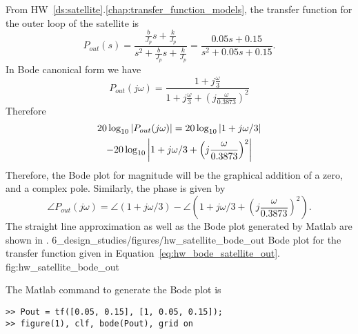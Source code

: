 From HW~\ref{ds:satellite}.\ref{chap:transfer_function_models}, the transfer function for the outer loop of the satellite is 
\begin{equation}\label{eq:hw_bode_satellite_out_tf}
P_{out}(s) = \frac{\frac{b}{J_p}s+\frac{k}{J_p}}{s^2+\frac{b}{J_p}s+\frac{k}{J_p}} =
\frac{0.05s + 0.15}{s^2+0.05s+0.15}. 
\end{equation}
In Bode canonical form we have
\[
P_{out}(j\omega) = \frac{1+j\frac{\omega}{3}}{1+j\frac{\omega}{3} + \left(j\frac{\omega}{0.3873}\right)^2}
\]
Therefore
\begin{multline} \label{eq:hw_bode_satellite_out}
20\log_{10}\left|P_{out}(j\omega)\right|=
	20\log_{10} \left|1+j\omega/3\right| \\
	-20\log_{10}\left|1+j\omega/3 + \left(j\frac{\omega}{0.3873}\right)^2\right|
\end{multline}
Therefore, the Bode plot for magnitude will be the graphical addition of a zero, and a complex pole.
Similarly, the phase is given by
\[
\angle P_{out}(j\omega) = 
	\angle \left(1+j\omega/3\right)
	- \angle \left(1+j\omega/3 + \left(j\frac{\omega}{0.3873}\right)^2\right).
\]
The straight line approximation as well as the Bode plot generated by Matlab are shown in .
	{6_design_studies/figures/hw_satellite_bode_out}
	{Bode plot for the transfer function given in Equation~\eqref{eq:hw_bode_satellite_out}.}
	{fig:hw_satellite_bode_out}

The Matlab command to generate the Bode plot is
\begin{lstlisting}
>> Pout = tf([0.05, 0.15], [1, 0.05, 0.15]);
>> figure(1), clf, bode(Pout), grid on
\end{lstlisting}
